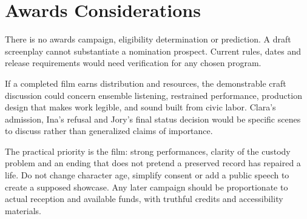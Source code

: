 \section{Awards Considerations}
There is no awards campaign, eligibility determination or prediction. A draft screenplay cannot substantiate a nomination prospect. Current rules, dates and release requirements would need verification for any chosen program.

If a completed film earns distribution and resources, the demonstrable craft discussion could concern ensemble listening, restrained performance, production design that makes work legible, and sound built from civic labor. Clara's admission, Ina's refusal and Jory's final status decision would be specific scenes to discuss rather than generalized claims of importance.

The practical priority is the film: strong performances, clarity of the custody problem and an ending that does not pretend a preserved record has repaired a life. Do not change character age, simplify consent or add a public speech to create a supposed showcase. Any later campaign should be proportionate to actual reception and available funds, with truthful credits and accessibility materials.
